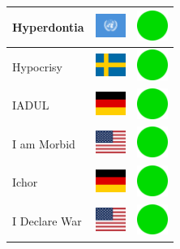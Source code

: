 \documentclass[12pt, a4paper, twoside]{report}
\begin{document}
\begin{center}
\begin{longtable}{|p{5cm}|p{2cm}|p{2cm}|}
 Hyperdontia                                                & \includegraphics[width=1cm]{../img/flags/un} &   \includegraphics[width=1cm]{../likes/y} \\ \hline
 Hypocrisy                                                  & \includegraphics[width=1cm]{../img/flags/se} &   \includegraphics[width=1cm]{../likes/y} \\ \hline
 IADUL                                                      & \includegraphics[width=1cm]{../img/flags/de} &   \includegraphics[width=1cm]{../likes/y} \\ \hline
 I am Morbid                                                & \includegraphics[width=1cm]{../img/flags/us} &   \includegraphics[width=1cm]{../likes/y} \\ \hline
 Ichor                                                      & \includegraphics[width=1cm]{../img/flags/de} &   \includegraphics[width=1cm]{../likes/y} \\ \hline
 I Declare War                                              & \includegraphics[width=1cm]{../img/flags/us} &   \includegraphics[width=1cm]{../likes/y} \\ \hline

\end{longtable}
\end{center}
\end{document}
